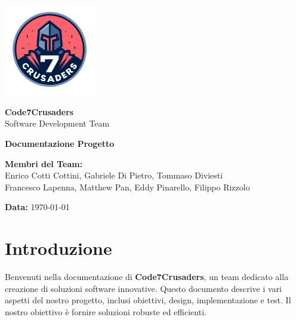 \documentclass{article}
\begin{document}
\begin{titlepage}
    \centering
    \vspace*{2cm}
    
    \includegraphics[width=0.3\textwidth]{../logo/7Crusaders_logo.png} %
    \vspace{1cm}
    
    {\Huge \textbf{Code7Crusaders}}\\
    \vspace{0.5cm}
    {\Large Software Development Team}\\
    \vspace{2cm}
    
    {\large \textbf{Documentazione Progetto}}\\
    \vspace{0.5cm}
    
    \vfill
    \textbf{Membri del Team:}\\
    Enrico Cotti Cottini, Gabriele Di Pietro, Tommaso Diviesti \\
    Francesco Lapenna, Matthew Pan, Eddy Pinarello, Filippo Rizzolo \\
    \vspace{0.5cm}
    
    {\large \textbf{Data:}} \today\\
    
    \vspace{1cm}
\end{titlepage}

\newpage
\tableofcontents
\newpage

\section{Introduzione}
\label{sec:introduzione}
Benvenuti nella documentazione di \textbf{Code7Crusaders}, un team dedicato alla creazione di soluzioni software innovative. Questo documento descrive i vari aspetti del nostro progetto, inclusi obiettivi, design, implementazione e test. Il nostro obiettivo è fornire soluzioni robuste ed efficienti.
\end{document}
